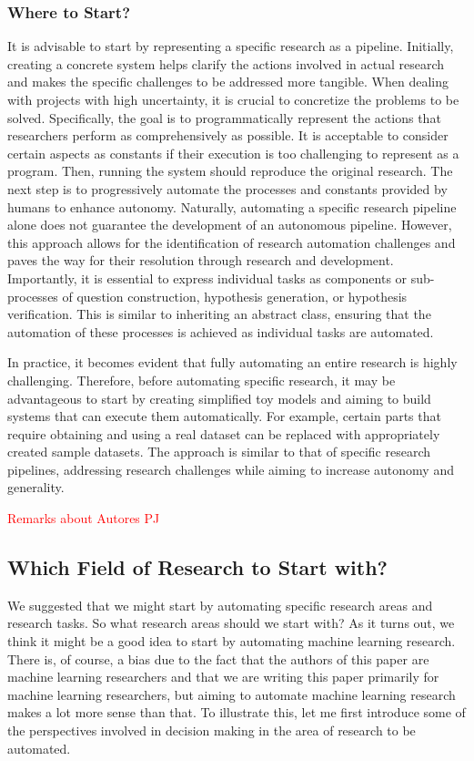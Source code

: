 \subsubsection{Where to Start?}
It is advisable to start by representing a specific research as a pipeline. Initially, creating a concrete system helps clarify the actions involved in actual research and makes the specific challenges to be addressed more tangible. When dealing with projects with high uncertainty, it is crucial to concretize the problems to be solved. Specifically, the goal is to programmatically represent the actions that researchers perform as comprehensively as possible. It is acceptable to consider certain aspects as constants if their execution is too challenging to represent as a program. Then, running the system should reproduce the original research. The next step is to progressively automate the processes and constants provided by humans to enhance autonomy. Naturally, automating a specific research pipeline alone does not guarantee the development of an autonomous pipeline. However, this approach allows for the identification of research automation challenges and paves the way for their resolution through research and development. Importantly, it is essential to express individual tasks as components or sub-processes of question construction, hypothesis generation, or hypothesis verification. This is similar to inheriting an abstract class, ensuring that the automation of these processes is achieved as individual tasks are automated.

In practice, it becomes evident that fully automating an entire research is highly challenging. Therefore, before automating specific research, it may be advantageous to start by creating simplified toy models and aiming to build systems that can execute them automatically. For example, certain parts that require obtaining and using a real dataset can be replaced with appropriately created sample datasets. The approach is similar to that of specific research pipelines, addressing research challenges while aiming to increase autonomy and generality.

\textcolor{red}{Remarks about Autores PJ}

\subsection{Which Field of Research to Start with?}
We suggested that we might start by automating specific research areas and research tasks. So what research areas should we start with? As it turns out, we think it might be a good idea to start by automating machine learning research. There is, of course, a bias due to the fact that the authors of this paper are machine learning researchers and that we are writing this paper primarily for machine learning researchers, but aiming to automate machine learning research makes a lot more sense than that. To illustrate this, let me first introduce some of the perspectives involved in decision making in the area of research to be automated.


